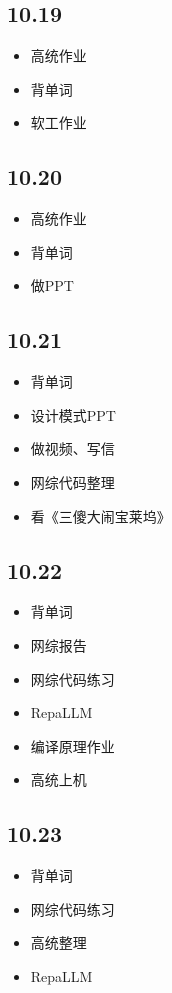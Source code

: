 \documentclass[UTF8]{ctexart}
\begin{document}
\subsection*{10.19}
\begin{itemize}
    \item 高统作业
    \item 背单词
    \item 软工作业
\end{itemize}

\subsection*{10.20}
\begin{itemize}
    \item 高统作业
    \item 背单词
    \item 做PPT
\end{itemize}

\subsection*{10.21}
\begin{itemize}
    \item 背单词
    \item 设计模式PPT
    \item 做视频、写信
    \item 网综代码整理
    \item 看《三傻大闹宝莱坞》
\end{itemize}

\subsection*{10.22}
\begin{itemize}
    \item 背单词
    \item 网综报告
    \item 网综代码练习
    \item RepaLLM
    \item 编译原理作业
    \item 高统上机
\end{itemize}

\subsection*{10.23}
\begin{itemize}
    \item 背单词
    \item 网综代码练习
    \item 高统整理
    \item RepaLLM
\end{itemize}
\end{document}
